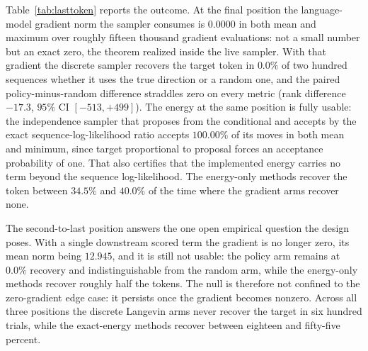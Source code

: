 Table~\ref{tab:lasttoken} reports the outcome. At the final position the language-model gradient norm the sampler consumes is $0.0000$ in both mean and maximum over roughly fifteen thousand gradient evaluations: not a small number but an exact zero, the theorem realized inside the live sampler. %
With that gradient the discrete sampler recovers the target token in $0.0\%$ of two hundred sequences whether it uses the true direction or a random one, and the paired policy-minus-random difference straddles zero on every metric (rank difference $-17.3$, $95\%$ CI $[-513,+499]$). %
The energy at the same position is fully usable: the independence sampler that proposes from the conditional and accepts by the exact sequence-log-likelihood ratio accepts $100.00\%$ of its moves in both mean and minimum, since target proportional to proposal forces an acceptance probability of one. That also certifies that the implemented energy carries no term beyond the sequence log-likelihood. %
The energy-only methods recover the token between $34.5\%$ and $40.0\%$ of the time where the gradient arms recover none.

The second-to-last position answers the one open empirical question the design poses. With a single downstream scored term the gradient is no longer zero, its mean norm being $12.945$, and it is still not usable: the policy arm remains at $0.0\%$ recovery and indistinguishable from the random arm, while the energy-only methods recover roughly half the tokens. %
The null is therefore not confined to the zero-gradient edge case: it persists once the gradient becomes nonzero. Across all three positions the discrete Langevin arms never recover the target in six hundred trials, while the exact-energy methods recover between eighteen and fifty-five percent.


